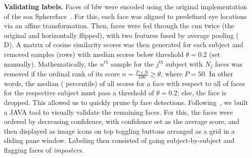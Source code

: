 \vspace{.5mm}
\noindent\textbf{Validating labels.} 
Faces of \gls{bfw} were encoded using the original implementation of the \gls{soa} Sphereface~\cite{liu2017sphereface}. For this, each face was aligned to predefined eye locations via an affine transformation. Then, faces were fed through the \gls{cnn} twice (\ie the original and horizontally flipped), with two features fused by average pooling ( D). A matrix of cosine similarity scores was then generated for each subject and removed samples (\ie rows) with median scores below threshold $\theta=0.2$ (set manually). Mathematically, the $n^{th}$ sample for the $j^{th}$ subject with $N_j$ faces was removed if the ordinal rank of its score $n = \frac{P\times N}{100}\geq\theta$, where $P=50$. In other words, the median ( percentile) of all scores for a face with respect to all of faces for the respective subject must pass a threshold of $\theta=0.2$; else, the face is dropped. This allowed us to quickly prune \gls{fp} face detections. Following~\cite{robinson2016families, robinson2018visual}, we built a JAVA tool to visually validate the remaining faces. For this, the faces were ordered by decreasing confidence, with confidence set as the average score, and then displayed as image icons on top toggling buttons arranged as a grid in a sliding pane window. Labeling then consisted of going subject-by-subject and flagging faces of \emph{imposters}.

